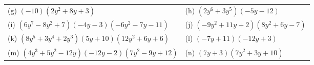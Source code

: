 \begin{enumerate}[noitemsep, label=\textbf{\arabic*}. ]
{\begin{tabular}[t]{|l|l|}
        (g) $\left(-10\right)\left(2{y}^{2}+8y+3\right)$ &
        (h) $\left(2{y}^{6}+3{y}^{5}\right)\left(-5y-12\right)$%
     \tabularnewline\cline{1-1}\cline{2-2}
        (i) $\left(6{y}^{7}-8{y}^{2}+7\right)\left(-4y-3\right)\left(-6{y}^{2}-7y-11\right)$ &
        (j) $\left(-9{y}^{2}+11y+2\right)\left(8{y}^{2}+6y-7\right)$%
     \tabularnewline\cline{1-1}\cline{2-2}
        (k) $\left(8{y}^{5}+3{y}^{4}+2{y}^{3}\right)\left(5y+10\right)\left(12{y}^{2}+6y+6\right)$ &
        (l) $\left(-7y+11\right)\left(-12y+3\right)$%
     \tabularnewline\cline{1-1}\cline{2-2}
        (m) $\left(4{y}^{3}+5{y}^{2}-12y\right)\left(-12y-2\right)\left(7{y}^{2}-9y+12\right)$ &
        (n) $\left(7y+3\right)\left(7{y}^{2}+3y+10\right)$%
     \tabularnewline\cline{1-1}\cline{2-2}

\end{tabular}}
\end{enumerate}
